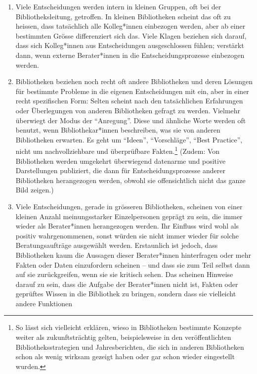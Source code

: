 \documentclass[a4paper,
fontsize=11pt,
oneside,
numbers=noperiodatend,
parskip=half-,
bibliography=totoc,
final
]{scrartcl}
\begin{document}
\begin{enumerate}
\def\labelenumi{(\arabic{enumi})}
\item
  Viele Entscheidungen werden intern in kleinen Gruppen, oft bei der
  Bibliotheksleitung, getroffen. In kleinen Bibliotheken scheint das oft
  zu heissen, dass tatsächlich alle Kolleg*innen einbezogen werden, aber
  ab einer bestimmten Grösse differenziert sich das. Viele Klagen
  beziehen sich darauf, dass sich Kolleg*innen aus Entscheidungen
  ausgeschlossen fühlen; verstärkt dann, wenn externe Berater*innen in
  die Entscheidungsprozesse einbezogen werden.
\item
  Bibliotheken beziehen noch recht oft andere Bibliotheken und deren
  Lösungen für bestimmte Probleme in die eigenen Entscheidungen mit ein,
  aber in einer recht spezifischen Form: Selten scheint nach den
  tatsächlichen Erfahrungen oder Überlegungen von anderen Bibliotheken
  gefragt zu werden. Vielmehr überwiegt der Modus der
  \enquote{Anregung}. Diese und ähnliche Worte werden oft benutzt, wenn
  Bibliothekar*innen beschreiben, was sie von anderen Bibliotheken
  erwarten. Es geht um \enquote{Ideen}, \enquote{Vorschläge},
  \enquote{Best Practice}, nicht um nachvollziehbare und überprüfbare
  Fakten.\footnote{So lässt sich vielleicht erklären, wieso in
    Bibliotheken bestimmte Konzepte weiter als zukunftsträchtig gelten,
    beispielsweise in den veröffentlichten Bibliotheksstrategien und
    Jahresberichten, die sich in anderen Bibliotheken schon als wenig
    wirksam gezeigt haben oder gar schon wieder eingestellt wurden.}
  (Zudem: Von Bibliotheken werden umgekehrt überwiegend datenarme und
  positive Darstellungen publiziert, die dann für Entscheidungsprozesse
  anderer Bibliotheken herangezogen werden, obwohl sie offensichtlich
  nicht das ganze Bild zeigen.)
\item
  Viele Entscheidungen, gerade in grösseren Bibliotheken, scheinen von
  einer kleinen Anzahl meinungsstarker Einzelpersonen geprägt zu sein,
  die immer wieder als Berater*innen herangezogen werden. Ihr Einfluss
  wird wohl als positiv wahrgenommenen, sonst würden sie nicht immer
  wieder für solche Beratungsaufträge ausgewählt werden. Erstaunlich ist
  jedoch, dass Bibliotheken kaum die Aussagen dieser Berater*innen
  hinterfragen oder mehr Fakten oder Daten einzufordern scheinen -- und
  dass sie zum Teil selbst dann auf sie zurückgreifen, wenn sie sie
  kritisch sehen. Das scheinen Hinweise darauf zu sein, dass die Aufgabe
  der Berater*innen nicht ist, Fakten oder geprüftes Wissen in die
  Bibliothek zu bringen, sondern dass sie vielleicht andere Funktionen

\end{enumerate}
\end{document}

